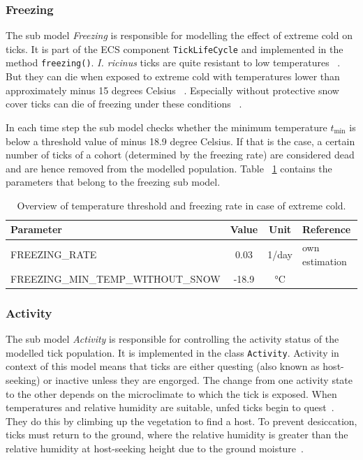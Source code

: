 \documentclass[a4paper, 11pt]{scrartcl}
\newcommand{\inlinecode}[1]{\texttt{\small #1}}
\begin{document}
\subsubsection{Freezing}
The sub model \emph{Freezing} is responsible for modelling the effect of extreme cold on ticks. It is part of the ECS component \inlinecode{TickLifeCycle} and implemented in the method \inlinecode{freezing()}. \emph{I. ricinus} ticks are quite resistant to low temperatures ~\parencite{Gray.2009}. But they can die when exposed to extreme cold with temperatures lower than approximately minus 15 degrees Celsius ~\parencite{Ostfeld.2015}. Especially without protective snow cover ticks can die of freezing under these conditions ~\parencite{Jore.2014}.

In each time step the sub model checks whether the minimum temperature $t_{\min}$ is below a threshold value of minus 18.9 degree Celsius. If that is the case, a certain number of ticks of a cohort (determined by the freezing rate) are considered dead and are hence removed from the modelled population. Table ~\ref{tab:freezing_parameters} contains the parameters that belong to the freezing sub model.

\begin{table}[h!]
\caption[Overview of temperature threshold and freezing rate.]{Overview of temperature threshold and freezing rate in case of extreme cold.}
\label{tab:freezing_parameters}
\begin{tabularx}{\textwidth}{lccl}
\toprule
\textbf{Parameter}								& \textbf{Value} & \textbf{Unit}	& \textbf{Reference}  		\\
\midrule
\small{FREEZING\_RATE}		    			 	&   0.03    	& 1/day & own estimation 	\\
\small{FREEZING\_MIN\_TEMP\_WITHOUT\_SNOW}	   	&   -18.9    	& °C &  ~\textcite{Gray.2009} \\
\bottomrule
\end{tabularx}
\end{table}

\subsubsection{Activity}
The sub model \emph{Activity} is responsible for controlling the activity status of the modelled tick population. It is implemented in the class \inlinecode{Activity}. Activity in context of this model means that ticks are either questing (also known as host-seeking) or inactive unless they are engorged. The change from one activity state to the other depends on the microclimate to which the tick is exposed. When temperatures and relative humidity are suitable, unfed ticks begin to quest~\parencite{Perret.2000}. They do this by climbing up the vegetation to find a host. To prevent desiccation, ticks must return to the ground, where the relative humidity is greater than the relative humidity at host-seeking height due to the ground moisture~\parencite{Randolph.2004}.
\end{document}
